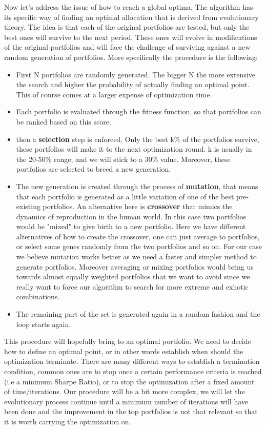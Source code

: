 
Now let's address the issue of how to reach a global optima. The algorithm has its specific way of finding an optimal allocation that is derived from evolutionary theory. The idea is that each of the original portfolios are tested, but only the best ones will survive to the next period. These ones will evolve in modifications of the original portfolios and will face the challenge of surviving against a new random generation of portfolios. More specifically the procedure is the following:

\begin{itemize}
	\item First N portfolios are randomly generated. The bigger N the more extensive the search and higher the probability of actually finding an optimal point. This of course comes at a larger expense of optimization time.
	\item Each portfolio is evaluated through the fitness function, so that portfolios can be ranked based on this score.
	\item then a \textbf{selection} step is enforced. Only the best k\% of the portfolios survive, these portfolios will make it to the next optimization round. k is usually in the 20-50\% range, and we will stick to a 30\% value. Moreover, these portfolios are selected to breed a new generation.
	\item The new generation is created through the process of \textbf{mutation}, that means that each portfolio is generated as a little variation of one of the best pre-existing portfolios. An alternative here is \textbf{crossover} that mimics the dynamics of reproduction in the human world. In this case two portfolios would be "mixed" to give birth to a new portfolio. Here we have different alternatives of how to create the crossover, one can just average to portfolios, or select some genes randomly from the two portfolios and so on. For our case we believe mutation works better as we need a faster and simpler method to generate portfolios. Moreover averaging or mixing portfolios would bring us towards almost equally weighted portfolios that we want to avoid since we really want to force our algorithm to search for more extreme and exhotic combinations. 
	\item The remaining part of the set is generated again in a random fashion and the loop starts again.
\end{itemize}

This procedure will hopefully bring to an optimal portfolio. We need to decide how to define an optimal point, or in other words establish when should the optimization terminate. There are many different ways to establish a termination condition, common ones are to stop once a certain performance criteria is reached (i.e a minimum Sharpe Ratio), or to stop the optimization after a fixed amount of time/iterations. Our procedure will be a bit more complex, we will let the evolutionary process continue until a minimum number of iterations will have been done and the improvement in the top portfolios is not that relevant so that it is worth carrying the optimization on. 